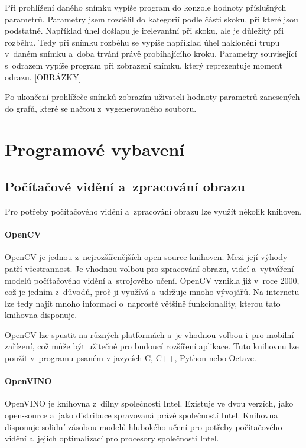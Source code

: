 Při prohlížení daného snímku vypíše program do konzole hodnoty příslušných parametrů. Parametry jsem rozdělil do kategorií podle části skoku, při které jsou podstatné. Například úhel došlapu je irelevantní při skoku, ale je důležitý při rozběhu. Tedy při snímku rozběhu se vypíše například úhel naklonění trupu v~daném snímku a~doba trvání právě probíhajícího kroku. Parametry související s~odrazem vypíše program při zobrazení snímku, který reprezentuje moment odrazu. [OBRÁZKY]

Po ukončení prohlížeče snímků zobrazím uživateli hodnoty parametrů zanesených do grafů, které se načtou z~vygenerovaného souboru.




\section{Programové vybavení}

\subsection{Počítačové vidění a~zpracování obrazu}

Pro potřeby počítačového vidění a~zpracování obrazu lze využít několik knihoven.

\paragraph{OpenCV}

 OpenCV \citep{OpenCV} je jednou z~nejrozšířenějších open-source knihoven. Mezi její výhody patří všestrannost. Je vhodnou volbou pro zpracování obrazu, videí a~vytváření modelů počítačového vidění a~strojového učení. OpenCV vznikla již v~roce 2000, což je jedním z~důvodů, proč ji využívá a~udržuje mnoho vývojářů. Na internetu lze tedy najít mnoho informací o~naprosté většině funkcionality, kterou tato knihovna disponuje.

OpenCV lze spustit na různých platformách a~je vhodnou volbou i~pro mobilní zařízení, což může být užitečné pro budoucí rozšíření aplikace. Tuto knihovnu lze použít v~programu psaném v jazycích C, C++, Python nebo Octave.

\paragraph{OpenVINO}

OpenVINO je knihovna z~dílny společnosti Intel. Existuje ve dvou verzích, jako open-source a~jako distribuce spravovaná právě společností Intel. Knihovna disponuje solidní zásobou modelů hlubokého učení pro potřeby počítačového vidění a~jejich optimalizací pro procesory společnosti Intel.

